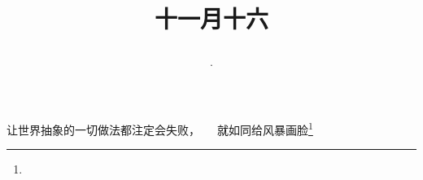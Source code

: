 \title{\date[d=16,m=12,y=2024][year:cn-y,年,month:cn,day:cn,日,·,weekday]·十一月十六 }
让世界抽象的一切做法都注定会失败，　　就如同给风暴画脸\footnote{ }

